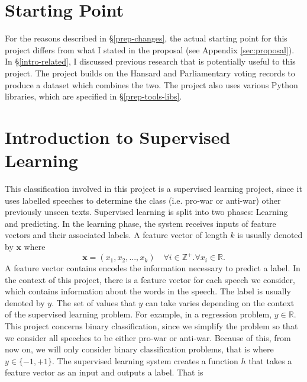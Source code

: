 \documentclass[12pt,a4paper,twoside,openright]{report}
\begin{document}
\section{Starting Point} \label{prep-start}
For the reasons described in \S\ref{prep-changes}, the actual starting point for this project differs from what I stated in the proposal (see Appendix \ref{sec:proposal}). In \S\ref{intro-related}, I discussed previous research that is potentially useful to this project. The project builds on the Hansard \cite{hansard} and Parliamentary voting records to produce a dataset which combines the two. The project also uses various Python libraries, which are specified in \S\ref{prep-tools-libs}.
\section{Introduction to Supervised Learning} \label{prep-supervised} \label{supervised-learning}
This classification involved in this project is a supervised learning project, since it uses labelled speeches to determine the class (i.e. pro-war or anti-war) other previously unseen texts. Supervised learning is split into two phases: Learning and predicting.
\newline
\newline
In the learning phase, the system receives inputs of feature vectors and their associated labels. A feature vector of length $k$ is usually denoted by $\mathbf{x}$ where 
\begin{equation}
	\mathbf{x} = (x_1, x_2, ..., x_k) \quad \forall i \in \mathbb{Z}^+ . \forall x_i \in \mathbb{R}.
\end{equation}
A feature vector contains encodes the information necessary to predict a label. In the context of this project, there is a feature vector for each speech we consider, which contains information about the words in the speech. The label is usually denoted by $y$. The set of values that $y$ can take varies depending on the context of the supervised learning problem. For example, in a regression problem, $y \in \mathbb{R}$. This project concerns binary classification, since we simplify the problem so that we consider all speeches to be either pro-war or anti-war. Because of this, from now on, we will only consider binary classification problems, that is where $y \in \{-1, +1\}$.
\newline
\newline
The supervised learning system creates a function $h$ that takes a feature vector as an input and outputs a label. That is
\end{document}
